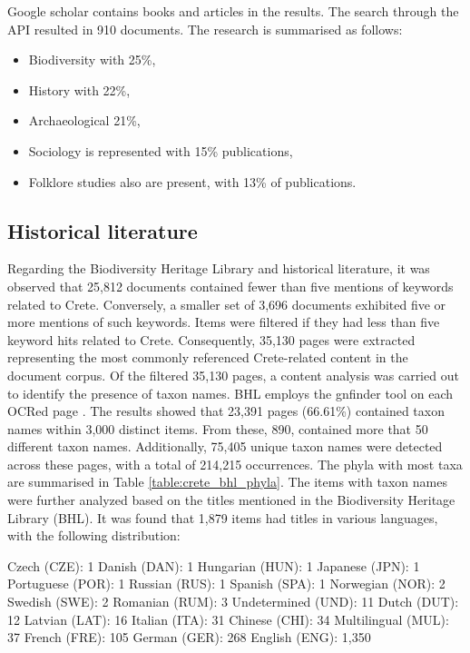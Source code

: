 Google scholar contains books and articles in the results. The search through
the API resulted in 910 documents. 
The research is summarised as follows:

\begin{itemize}
    \item Biodiversity with 25\%,
    \item History with 22\%,
    \item Archaeological 21\%,
    \item Sociology is represented with 15\% publications,
    \item Folklore studies also are present, with 13\% of publications.
\end{itemize}

\subsection{Historical literature}
Regarding the Biodiversity Heritage Library and historical literature, it was
observed that 25,812 documents contained fewer than five mentions of keywords related to Crete.
Conversely, a smaller set of 3,696 documents exhibited five or more mentions of such keywords.
Items were filtered if they had less than five keyword hits related to Crete.
Consequently, 35,130 pages were extracted representing the most commonly referenced Crete-related content in the document corpus.
Of the filtered 35,130 pages, a content analysis was carried out to identify the presence of taxon names.
BHL employs the gnfinder tool on each OCRed page \parencite{mozzherin_gnamesgnfinder_2022}.
The results showed that 23,391 pages (66.61\%) contained taxon names within 3,000 distinct items.
From these, 890, contained more that 50 different taxon names.
Additionally, 75,405 unique taxon names were detected across these pages, with a total of 214,215 occurrences. 
The phyla with most taxa are summarised in Table \ref{table:crete_bhl_phyla}. 
The items with taxon names were further analyzed based on the titles mentioned
in the Biodiversity Heritage Library (BHL). It was found that 1,879 items had titles in various languages, with the following distribution:

Czech (CZE): 1
Danish (DAN): 1
Hungarian (HUN): 1
Japanese (JPN): 1
Portuguese (POR): 1
Russian (RUS): 1
Spanish (SPA): 1
Norwegian (NOR): 2
Swedish (SWE): 2
Romanian (RUM): 3
Undetermined (UND): 11
Dutch (DUT): 12
Latvian (LAT): 16
Italian (ITA): 31
Chinese (CHI): 34
Multilingual (MUL): 37
French (FRE): 105
German (GER): 268
English (ENG): 1,350

